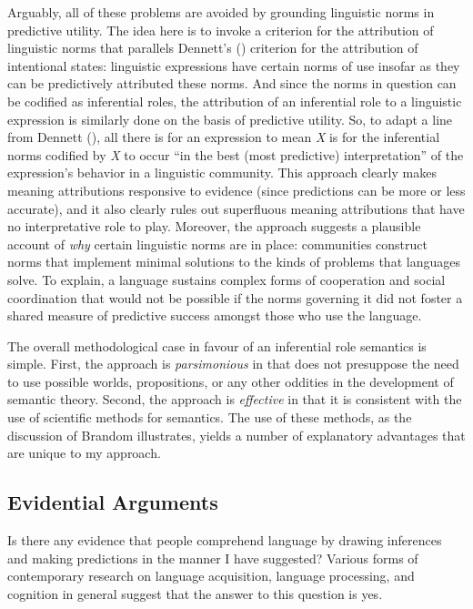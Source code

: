 Arguably, all of these problems are avoided by grounding linguistic norms in predictive utility. The idea here is to invoke a criterion for the attribution of linguistic norms that parallels Dennett's (\citeyear{Dennett:1987}) criterion for the attribution of intentional states: linguistic expressions have certain norms of use insofar as they can be predictively attributed these norms. And since the norms in question can be codified as inferential roles, the attribution of an inferential role to a linguistic expression is similarly done on the basis of predictive utility. So, to adapt a line from Dennett (\citeyear[][p. 29]{Dennett:1987}), all there is for an expression to mean \textit{X} is for the inferential norms codified by \textit{X} to occur ``in the best (most predictive) interpretation'' of the expression's behavior in a linguistic community. This approach clearly makes meaning attributions responsive to evidence (since predictions can be more or less accurate), and it also clearly rules out superfluous meaning attributions that have no interpretative role to play. Moreover, the approach suggests a plausible account of \textit{why} certain linguistic norms are in place: communities construct norms that implement minimal solutions to the kinds of problems that languages solve. To explain, a language sustains complex forms of cooperation and social coordination that would not be possible if the norms governing it did not foster a shared measure of predictive success amongst those who use the language.

The overall methodological case in favour of an inferential role semantics is simple. First, the approach is \textit{parsimonious} in that does not presuppose the need to use possible worlds, propositions, or any other oddities in the development of semantic theory. Second, the approach is \textit{effective} in that it is consistent with the use of scientific methods for semantics. The use of these methods, as the discussion of Brandom illustrates, yields a number of explanatory advantages that are unique to my approach.

\subsection{Evidential Arguments}

Is there any evidence that people comprehend language by drawing inferences and making predictions in the manner I have suggested? Various forms of contemporary research on language acquisition, language processing, and cognition in general suggest that the answer to this question is yes.

